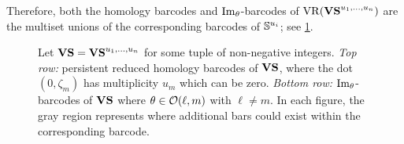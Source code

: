 Therefore, both the homology barcodes and \(\operatorname{Im}_\theta\)-barcodes of \(\mathrm{VR}(\mathbf{VS}^{u_1, \dots, u_n})\) are the multiset unions of the corresponding barcodes of \(\mathbb{S}^{u_i}\); see \cref{fig:barcodes_vs}.



\begin{figure}
	\centering
	
	\caption{Let $\mathbf{VS} = \mathbf{VS}^{u_1,\dots,u_n}$ for some tuple of non-negative integers.
		\emph{Top row:} persistent reduced homology barcodes of $\mathbf{VS}$, where the dot $(0,\zeta_m)$ has multiplicity $u_m$ which can be zero.
		\emph{Bottom row:} $\operatorname{Im}_\theta$-barcodes of $\mathbf{VS}$ where $\theta \in \mathcal{O}(\ell,m)$ with \(\ell \neq m\).
        In each figure, the gray region represents where additional bars could exist within the corresponding barcode.}
	\label{fig:barcodes_vs}
\end{figure}